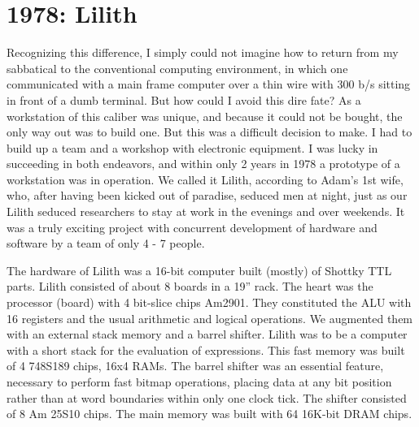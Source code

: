 \section{1978: Lilith}
Recognizing this difference, I simply could not imagine how to return from my
sabbatical to the conventional computing environment, in which one communicated
with a main frame computer over a thin wire with 300 b/s sitting in front of a dumb
terminal. But how could I avoid this dire fate? As a workstation of this caliber was
unique, and because it could not be bought, the only way out was to build one. But
this was a difficult decision to make. I had to build up a team and a workshop with
electronic equipment. I was lucky in succeeding in both endeavors, and within only
2 years in 1978 a prototype of a workstation was in operation. We called it Lilith,
according to Adam's 1st wife, who, after having been kicked out of paradise,
seduced men at night, just as our Lilith seduced researchers to stay at work in the
evenings and over weekends. It was a truly exciting project with concurrent
development of hardware and software by a team of only 4 - 7 people.

The hardware of Lilith was a 16-bit computer built (mostly) of Shottky TTL parts.
Lilith consisted of about 8 boards in a 19” rack. The heart was the processor
(board) with 4 bit-slice chips Am2901. They constituted the ALU with 16 registers
and the usual arithmetic and logical operations. We augmented them with an
external stack memory and a barrel shifter. Lilith was to be a computer with a short
stack for the evaluation of expressions. This fast memory was built of 4 748S189
chips, 16x4 RAMs. The barrel shifter was an essential feature, necessary to
perform fast bitmap operations, placing data at any bit position rather than at word
boundaries within only one clock tick. The shifter consisted of 8 Am 25S10 chips.
The main memory was built with 64 16K-bit DRAM chips.

